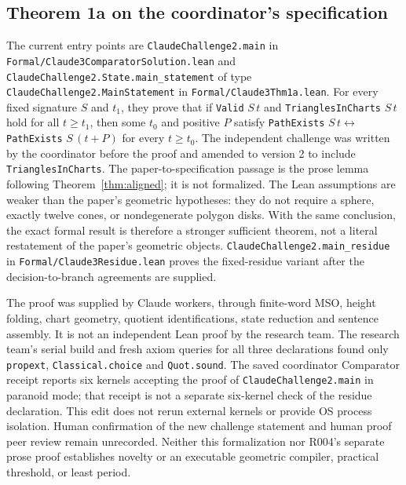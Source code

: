 \documentclass[11pt]{amsart}
\newcommand{\record}[1]{\nolinkurl{#1}}
\theoremstyle{definition}\newtheorem{definition}{Definition}
\begin{document}
\subsection{Theorem 1a on the coordinator's specification}
The current entry points are \record{ClaudeChallenge2.main} in
\record{Formal/Claude3ComparatorSolution.lean} and
\record{ClaudeChallenge2.State.main_statement} of type
\record{ClaudeChallenge2.MainStatement} in \record{Formal/Claude3Thm1a.lean}.
For every fixed signature $S$ and $t_1$, they prove that if
\record{Valid} $S\,t$ and \record{TrianglesInCharts} $S\,t$ hold for all
$t\ge t_1$, then some $t_0$ and positive $P$ satisfy
\record{PathExists} $S\,t\leftrightarrow$ \record{PathExists} $S\,(t+P)$
for every $t\ge t_0$. The independent challenge was written by the
coordinator before the proof and amended to version 2 to include
\record{TrianglesInCharts}. The paper-to-specification passage is the
prose lemma following Theorem~\ref{thm:aligned}; it is not formalized.
The Lean assumptions are weaker than the paper's geometric hypotheses:
they do not require a sphere, exactly twelve cones, or nondegenerate
polygon disks. With the same conclusion, the exact formal result is
therefore a stronger sufficient theorem, not a literal restatement
of the paper's geometric objects.
\record{ClaudeChallenge2.main_residue} in \record{Formal/Claude3Residue.lean}
proves the fixed-residue variant after the decision-to-branch agreements
are supplied.

The proof was supplied by Claude workers, through finite-word MSO,
height folding, chart geometry, quotient identifications, state
reduction and sentence assembly. It is not an independent Lean
proof by the research team. The research team's serial build and
fresh axiom queries for all three declarations found only
\record{propext}, \record{Classical.choice} and \record{Quot.sound}.
The saved coordinator Comparator receipt reports six kernels
accepting the proof of \record{ClaudeChallenge2.main} in paranoid mode;
that receipt is not a separate six-kernel check of the residue declaration.
This edit does not rerun external kernels or provide OS process isolation.
Human confirmation of the new challenge statement and human proof
peer review remain unrecorded. Neither this formalization nor
R004's separate prose proof establishes novelty or an executable
geometric compiler, practical threshold, or least period.
\end{document}

